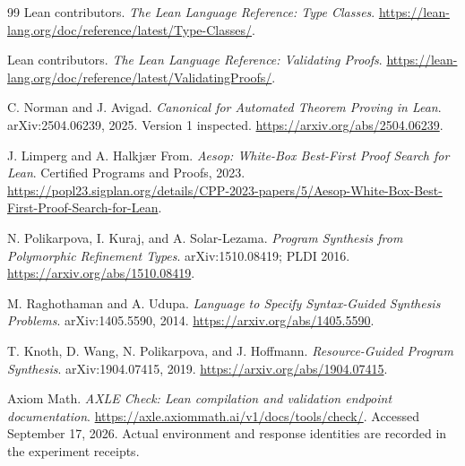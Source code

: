 \documentclass[11pt,a4paper]{article}
\theoremstyle{remark}
\begin{document}
\begin{thebibliography}{99}
Lean contributors.
\emph{The Lean Language Reference: Type Classes}.
\url{https://lean-lang.org/doc/reference/latest/Type-Classes/}.

Lean contributors.
\emph{The Lean Language Reference: Validating Proofs}.
\url{https://lean-lang.org/doc/reference/latest/ValidatingProofs/}.

C. Norman and J. Avigad.
\emph{Canonical for Automated Theorem Proving in Lean}.
arXiv:2504.06239, 2025. Version 1 inspected.
\url{https://arxiv.org/abs/2504.06239}.

J. Limperg and A. Halkj{\ae}r From.
\emph{Aesop: White-Box Best-First Proof Search for Lean}.
Certified Programs and Proofs, 2023.
\url{https://popl23.sigplan.org/details/CPP-2023-papers/5/Aesop-White-Box-Best-First-Proof-Search-for-Lean}.

N. Polikarpova, I. Kuraj, and A. Solar-Lezama.
\emph{Program Synthesis from Polymorphic Refinement Types}.
arXiv:1510.08419; PLDI 2016.
\url{https://arxiv.org/abs/1510.08419}.

M. Raghothaman and A. Udupa.
\emph{Language to Specify Syntax-Guided Synthesis Problems}.
arXiv:1405.5590, 2014.
\url{https://arxiv.org/abs/1405.5590}.

T. Knoth, D. Wang, N. Polikarpova, and J. Hoffmann.
\emph{Resource-Guided Program Synthesis}.
arXiv:1904.07415, 2019.
\url{https://arxiv.org/abs/1904.07415}.

Axiom Math.
\emph{AXLE Check: Lean compilation and validation endpoint documentation}.
\url{https://axle.axiommath.ai/v1/docs/tools/check/}.
Accessed September 17, 2026. Actual environment and response identities are recorded in the experiment receipts.
\end{thebibliography}
\end{document}
